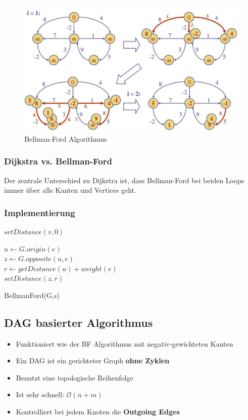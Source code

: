 \begin{figure}[h]
\centering
\includegraphics[width=0.9\linewidth]{images/bellman-ford}
\caption{Bellman-Ford Algorithmus}
\label{fig:bellman-ford}
\end{figure}

\subsubsection{Dijkstra vs. Bellman-Ford}
Der zentrale Unterschied zu Dijkstra ist, dass Bellman-Ford bei beiden Loops immer über alle Kanten und Vertices geht.

\subsubsection{Implementierung}
\begin{algorithm}[H]
	{
		{
			
			$setDistance(v,0)$ 
		}
		 {
			$u \leftarrow G.origin(e)$ \\	
			$z \leftarrow G.opposite(u, e)$ \\
			$r \leftarrow getDistance(u) + weight(e)$ \\
			{
				$setDistance(z,r)$
			}
		} 
	}
\caption{BellmanFord(G,s)}
\end{algorithm}

\subsection{DAG basierter Algorithmus}
\begin{itemize}
	\item Funktioniert wie der BF Algorithmus mit negativ-gewichteten Kanten
	\item Ein DAG ist ein gerichteter Graph \textbf{ohne Zyklen}
	\item Benutzt eine topologische Reihenfolge
	\item Ist sehr schnell: $\mathcal{O}(n+m)$
	\item Kontrolliert bei jedem Knoten die \textbf{Outgoing Edges}
\end{itemize}

